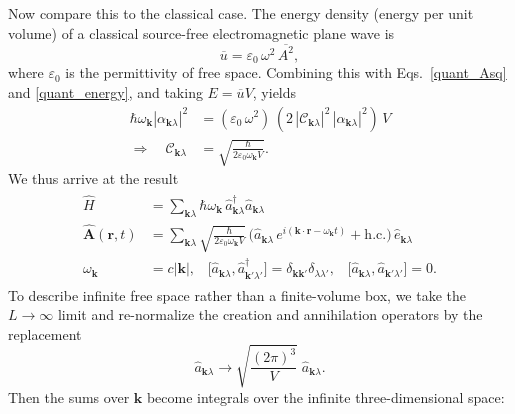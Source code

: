 \documentclass[pra,12pt]{revtex4}
\begin{document}
Now compare this to the classical case.  The energy density (energy
per unit volume) of a classical source-free electromagnetic plane wave
is
\begin{equation}
  \overline{u} = \varepsilon_0\, \omega^2 \, \overline{A^2},
\end{equation}
where $\varepsilon_0$ is the permittivity of free space.  Combining
this with Eqs.~\eqref{quant_Asq} and \eqref{quant_energy}, and taking
$E = \overline{u} V$, yields
\begin{align}
  \hbar\omega_{\mathbf{k}} |\alpha_{\mathbf{k}\lambda}|^2 &=
  \left(\varepsilon_0\, \omega^2\right) \,
  \left(2 \, |\mathcal{C}_{\mathbf{k}\lambda}|^2 \, |\alpha_{\mathbf{k}\lambda}|^2\right)\, V \\
  \Rightarrow \quad \mathcal{C}_{\mathbf{k}\lambda} &= \sqrt{\frac{\hbar}{2\varepsilon_0\omega_{\mathbf{k}}V}}.
\end{align}
We thus arrive at the result
\begin{align}
\boxed{\qquad
  \begin{aligned}
    \hat{H} &= \sum_{\mathbf{k}\lambda} \hbar \omega_{\mathbf{k}} \,
    \hat{a}^\dagger_{\mathbf{k}\lambda} \hat{a}_{\mathbf{k}\lambda} \\
  \hat{\mathbf{A}}(\mathbf{r},t) &= \sum_{\mathbf{k}\lambda} 
  \sqrt{\frac{\hbar}{2\varepsilon_0\omega_{\mathbf{k}}V}}\,
  \Big(\hat{a}_{\mathbf{k}\lambda} \, e^{i(\mathbf{k}\cdot\mathbf{r} - \omega_{\mathbf{k}} t)}
  + \mathrm{h.c.}\Big)\, \hat{e}_{\mathbf{k}\lambda} \\
  \omega_{\mathbf{k}} &= c|\mathbf{k}|,  \;\;\;
  \big[\hat{a}_{\mathbf{k}\lambda}, \hat{a}_{\mathbf{k}'\lambda'}^\dagger\big]
  = \delta_{\mathbf{k}\mathbf{k}'} \delta_{\lambda\lambda'}, \;\;\;
  \big[\hat{a}_{\mathbf{k}\lambda}, \hat{a}_{\mathbf{k}'\lambda'}\big]
  = 0.
  \end{aligned}
  \qquad}
  \label{qed1}
\end{align}
To describe infinite free space rather than a finite-volume box, we
take the $L\rightarrow \infty$ limit and re-normalize the creation and
annihilation operators by the replacement
\begin{equation}
  \hat{a}_{\mathbf{k}\lambda} \rightarrow \sqrt{\frac{(2\pi)^3}{V}} \;
  \hat{a}_{\mathbf{k}\lambda}.
\end{equation}
Then the sums over $\mathbf{k}$ become integrals over the infinite
three-dimensional space:
\end{document}
